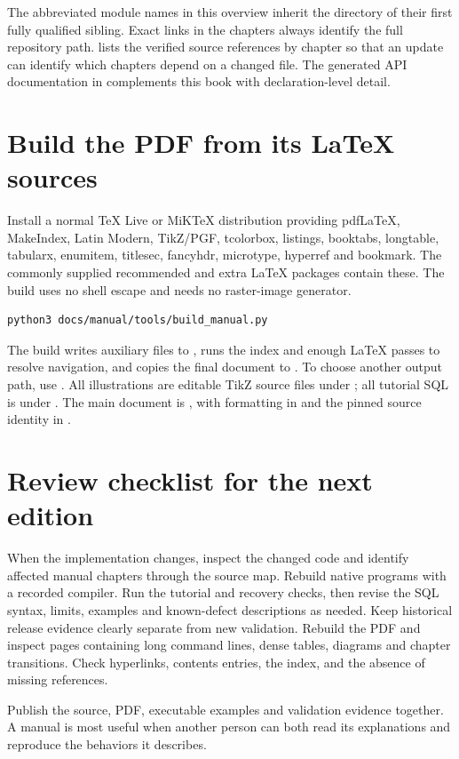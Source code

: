 The abbreviated module names in this overview inherit the directory of their
first fully qualified sibling. Exact links in the chapters always identify
the full repository path.  lists the verified source
references by chapter so that an update can identify which chapters depend
on a changed file. The generated API documentation in 
complements this book with declaration-level detail.

\section{Build the PDF from its LaTeX sources}
Install a normal TeX Live or MiKTeX distribution providing pdfLaTeX,
MakeIndex, Latin Modern, TikZ/PGF, tcolorbox, listings, booktabs, longtable,
tabularx, enumitem, titlesec, fancyhdr, microtype, hyperref and bookmark.
The commonly supplied recommended and extra LaTeX packages contain these.
The build uses no shell escape and needs no raster-image generator.

\begin{lstlisting}[language=bash]
python3 docs/manual/tools/build_manual.py
\end{lstlisting}
The build writes auxiliary files to , runs the index
and enough LaTeX passes to resolve navigation, and copies the final document
to . To choose another output path,
use . All illustrations are editable TikZ source files under
; all tutorial SQL is under . The main document
is , with formatting in  and
the pinned source identity in .

\section{Review checklist for the next edition}
When the implementation changes, inspect the changed code and identify
affected manual chapters through the source map. Rebuild native programs
with a recorded compiler. Run the tutorial and recovery checks, then revise
the SQL syntax, limits, examples and known-defect descriptions as needed.
Keep historical release evidence clearly separate from new validation.
Rebuild the PDF and inspect pages containing long command lines, dense
tables, diagrams and chapter transitions. Check hyperlinks, contents entries,
the index, and the absence of missing references.

Publish the source, PDF, executable examples and validation evidence together.
A manual is most useful when another person can both read its explanations
and reproduce the behaviors it describes.
